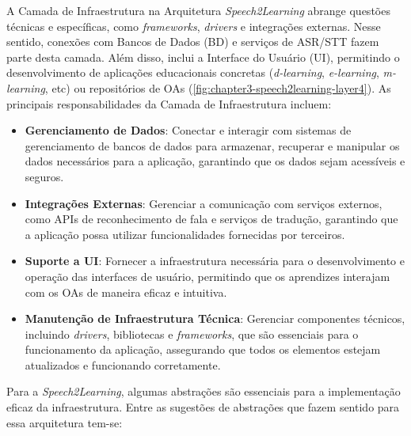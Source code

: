 A Camada de Infraestrutura na Arquitetura \textit{Speech2Learning} abrange questões técnicas e específicas, como \textit{frameworks}, \textit{drivers} e integrações externas. Nesse sentido, conexões com Bancos de Dados (BD) e serviços de ASR/STT fazem parte desta camada. Além disso, inclui a Interface do Usuário (UI), permitindo o desenvolvimento de aplicações educacionais concretas (\textit{d-learning}, \textit{e-learning}, \textit{m-learning}, etc) ou repositórios de OAs (\autoref{fig:chapter3-speech2learning-layer4}). As principais responsabilidades da Camada de Infraestrutura incluem:

\begin{itemize}
    \item \textbf{Gerenciamento de Dados}: Conectar e interagir com sistemas de gerenciamento de bancos de dados para armazenar, recuperar e manipular os dados necessários para a aplicação, garantindo que os dados sejam acessíveis e seguros.

    \item \textbf{Integrações Externas}: Gerenciar a comunicação com serviços externos, como APIs de reconhecimento de fala e serviços de tradução, garantindo que a aplicação possa utilizar funcionalidades fornecidas por terceiros.

    \item \textbf{Suporte a UI}: Fornecer a infraestrutura necessária para o desenvolvimento e operação das interfaces de usuário, permitindo que os aprendizes interajam com os OAs de maneira eficaz e intuitiva.

    \item \textbf{Manutenção de Infraestrutura Técnica}: Gerenciar componentes técnicos, incluindo \textit{drivers}, bibliotecas e \textit{frameworks}, que são essenciais para o funcionamento da aplicação, assegurando que todos os elementos estejam atualizados e funcionando corretamente.
\end{itemize}

Para a \textit{Speech2Learning}, algumas abstrações são essenciais para a implementação eficaz da infraestrutura. Entre as sugestões de abstrações que fazem sentido para essa arquitetura tem-se:

